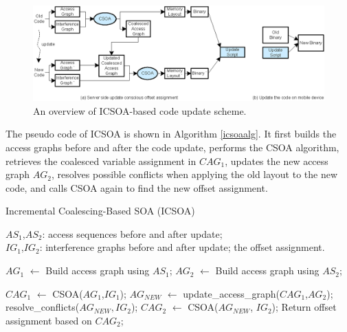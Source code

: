 \begin{figure}[htbp]
\begin{center}
\includegraphics[scale=1.2]{./figures/icsoa-overview.eps}
\caption{An overview of ICSOA-based code update scheme.}
\label{ioverview}
\end{center}
\end{figure}


The pseudo code of ICSOA is shown in Algorithm \ref{icsoaalg}. It first builds the access graphs before and after the 
code update, performs the CSOA algorithm, retrieves the coalesced variable assignment in $\textit{CAG}_1$, updates the 
new access graph $\textit{AG}_2$, resolves possible conflicts when applying the old layout to the new code, and calls 
CSOA again to find the new offset assignment. 

\begin{algorithm}
\caption{Incremental Coalescing-Based SOA (ICSOA)}
\singlespace
\label{icsoaalg}
\begin{algorithmic}[1]
\singlespace
\REQUIRE $\textit{AS}_1$,$\textit{AS}_2$: access sequences before and after update; \\
				 $\textit{IG}_1$,$\textit{IG}_2$: interference graphs before and after update;
\ENSURE the offset assignment.

\STATE $\textit{AG}_1$ $\leftarrow$ Build access graph using $\textit{AS}_1$;
\STATE $\textit{AG}_2$ $\leftarrow$ Build access graph using $\textit{AS}_2$;

\STATE $\textit{CAG}_1$ $\leftarrow$ CSOA($\textit{AG}_1$,$\textit{IG}_1$); 
\STATE $\textit{AG}_\textit{NEW}$ $\leftarrow$ update\_access\_graph($\textit{CAG}_1$,$\textit{AG}_2$); 
\STATE resolve\_conflicts($\textit{AG}_\textit{NEW},\textit{IG}_2$); 
\STATE $\textit{CAG}_2$ $\leftarrow$ CSOA($\textit{AG}_\textit{NEW}$, $\textit{IG}_2$);
\STATE Return offset assignment based on $\textit{CAG}_2$;
\end{algorithmic}
\end{algorithm}

